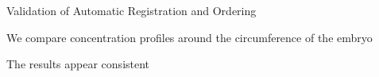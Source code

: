 \documentclass[10pt,aspectratio=169]{beamer}
\begin{document}
\begin{frame}{Validation of Automatic Registration and Ordering}


\begin{center}

We compare concentration profiles around the circumference of the embryo


\end{center}

\centering
\begin{minipage}{3.1in}
\centering
The results appear consistent 


\end{minipage}
\end{frame}
\end{document}
